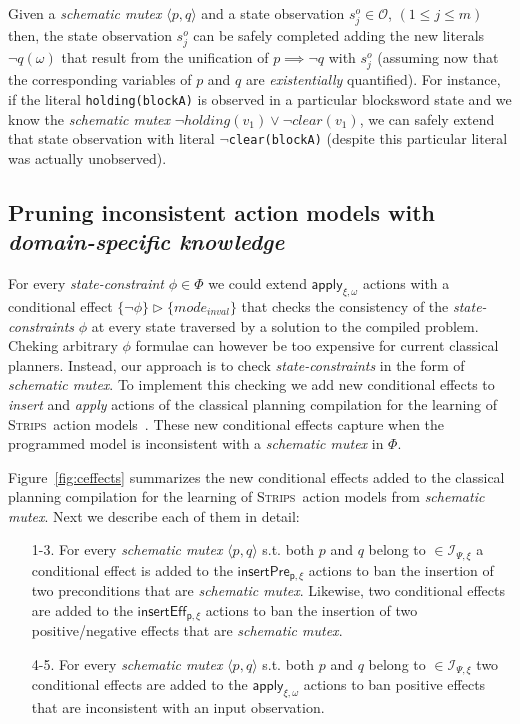 \documentclass{article}
\newcommand{\tup}[1]{{\langle #1 \rangle}}
\newcommand{\strips}{\textsc{Strips}}
\begin{document}
Given a {\em schematic mutex} $\tup{p,q}$ and a state observation $s_j^o\in \mathcal{O}$, {\small $(1\leq j\leq m)$} then, the state observation $s_j^o$ can be safely completed adding the new literals $\neg q(\omega)$ that result from the unification of $p\implies \neg q$ with $s_j^o$ (assuming now that the corresponding variables of $p$ and $q$ are {\em existentially} quantified). For instance, if the literal {\tt\small holding(blockA)} is observed in a particular blocksword state and we know the {\em schematic mutex} $\neg holding(v_1)\vee\neg clear(v_1)$, we can safely extend that state observation with literal {\tt\small $\neg$clear(blockA)} (despite this particular literal was actually unobserved).


\subsection{Pruning inconsistent action models with {\em domain-specific knowledge}}
For every {\em state-constraint} $\phi\in\Phi$ we could extend $\mathsf{apply_{\xi,\omega}}$ actions with a conditional effect $\{\neg\phi\}\rhd\{mode_{inval}\}$ that checks the consistency of the {\em state-constraints} $\phi$ at every state traversed by a solution to the compiled problem. Cheking arbitrary $\phi$ formulae can however be too expensive for current classical planners. Instead, our approach is to check {\em state-constraints} in the form of {\em schematic mutex}. To implement this checking we add new conditional effects to {\em insert} and {\em apply} actions of the classical planning compilation for the learning of \strips\ action models~\cite{aineto2018learning}. These new conditional effects capture when the programmed model is inconsistent with a {\em schematic mutex} in $\Phi$.

Figure~\ref{fig:ceffects} summarizes the new conditional effects added to the classical planning compilation for the learning of \strips\ action models from {\em schematic mutex}. Next we describe each of them in detail:
\begin{enumerate}
\item[1-3.] For every {\em schematic mutex} $\tup{p,q}$ s.t. both $p$ and $q$ belong to $\in{\mathcal I}_{\Psi,\xi}$ a conditional effect is added to the $\mathsf{insertPre_{p,\xi}}$ actions to ban the insertion of two preconditions that are {\em schematic mutex}. Likewise, two conditional effects are added to the $\mathsf{insertEff_{p,\xi}}$ actions to ban the insertion of two positive/negative effects that are {\em schematic mutex}.
\item[4-5.] For every {\em schematic mutex} $\tup{p,q}$ s.t. both $p$ and $q$ belong to $\in{\mathcal I}_{\Psi,\xi}$ two conditional effects are added to the $\mathsf{apply_{\xi,\omega}}$ actions to ban positive effects that are inconsistent with an input observation.
\end{enumerate}
\end{document}
